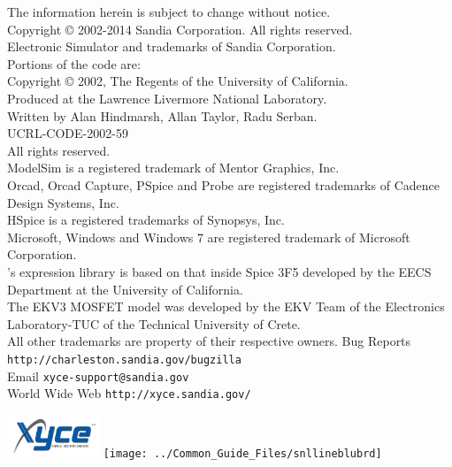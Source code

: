 The information herein is subject to change without notice.\\[0.5em]
Copyright \copyright{} 2002-2014 Sandia Corporation.  All rights
reserved.\\
\XyceTM{} Electronic Simulator and \XyceTM{} trademarks of Sandia
Corporation.\\
Portions of the \XyceTM{} code are:  \\
Copyright \copyright{} 2002, The Regents of the University of California. \\
Produced at the Lawrence Livermore National Laboratory. \\
Written by Alan Hindmarsh, Allan Taylor, Radu Serban. \\
UCRL-CODE-2002-59 \\
All rights reserved. \\[0.5em]
ModelSim is a registered trademark of Mentor Graphics, Inc.\\[0.5em]
Orcad, Orcad Capture, PSpice and Probe are registered trademarks of Cadence Design Systems, Inc.\\[0.5em]
HSpice is a registered trademarks of Synopsys, Inc.\\[0.5em]
Microsoft, Windows and Windows 7 are registered trademark of Microsoft
Corporation.\\[0.5em]
\Xyce{}'s expression library is based on that inside Spice 3F5 developed by
the EECS Department at the University of California. \\[0.5em]
The EKV3 MOSFET model was developed by the EKV Team of the Electronics Laboratory-TUC of the Technical University of Crete. \\[0.5em]
All other trademarks are property of their respective owners.
 \label{Contacts}
Bug Reports \hfill \texttt{\color{XyceDeepRed}http://charleston.sandia.gov/bugzilla} \\
Email \hfill \texttt{\color{XyceDeepRed}xyce-support@sandia.gov} \\
World Wide Web \hfill \texttt{\color{XyceDeepRed}http://xyce.sandia.gov/}

\vspace*{\fill}
\includegraphics[height=0.5in]{../Common_Guide_Files/xyce_flat_white}
\hfill
\texttt{[image: ../Common\_Guide\_Files/snllineblubrd]}

